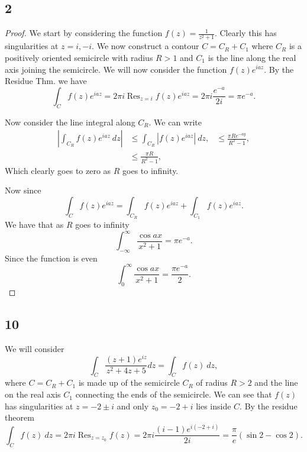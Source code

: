 \documentclass{article}
\DeclareMathOperator*{\Res}{Res}
\begin{document}
\subsection*{2}
\begin{proof}
    We start by considering the function $f(z) = \frac{1}{z^2 + 1}$. Clearly
    this has singularities at $z = i, -i$. We now construct a contour $C = C_R + C_1$
    where $C_R$ is a positively oriented semicircle with radius $R > 1$ and
    $C_1$ is the line along the real axis joining the semicircle. We will now
    consider the function $f(z)e^{iaz}$. By the Residue Thm. we have
    \begin{equation*}
        \int_C f(z)e^{iaz} = 2\pi i \Res_{z=i} f(z)e^{iaz} = 2\pi i \frac{e^{-a}}{2i} = \pi e^{-a}.
    \end{equation*}

    Now consider the line integral along $C_R$. We can write
    \begin{align*}
        \left|\int_{C_R} f(z) e^{iaz} \ dz \right| & \leq \int_{C_R}\left| f(z) e^{iaz} \right| \ dz,
                                                   & \leq \frac{\pi Re^{-ay}}{R^2 - 1},               \\
                                                   & \leq \frac{\pi R}{R^2 - 1},
    \end{align*}
    Which clearly goes to zero as $R$ goes to infinity.

    Now since
    \begin{equation*}
        \int_C f(z)e^{iaz} = \int_{C_R} f(z)e^{iaz} + \int_{C_1} f(z)e^{iaz}.
    \end{equation*}
    We have that as $R$ goes to infinity
    \begin{equation*}
        \int_{-\infty}^\infty \frac{\cos ax}{x^2 + 1} = \pi e^{-a}.
    \end{equation*}
    Since the function is even
    \begin{equation*}
        \int_0^\infty \frac{\cos ax}{x^2 + 1} = \frac{\pi e^{-a}}{2}.
    \end{equation*}
\end{proof}

\subsection*{10}
We will consider
\begin{equation*}
    \int_C \frac{(z+1)e^{iz}}{z^2 + 4z + 5}dz = \int_C f(z) \ dz,
\end{equation*}
where $C = C_R + C_1$ is made up of the semicircle $C_R$ of radius $R>2$ and the
line on the real axis $C_1$ connecting the ends of the semicircle. We can see that
$f(z)$ has singularities at $z = -2 \pm i$ and only $z_0 = -2 + i$ lies inside $C$.
By the residue theorem
\begin{equation*}
    \int_C f(z) \ dz = 2\pi i\Res_{z=z_0} f(z) = 2\pi i \frac{(i -1)e^{i(-2+i)}}{2i}
    = \frac{\pi}{e}(\sin 2 - \cos 2).
\end{equation*}
\end{document}
